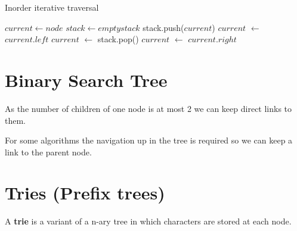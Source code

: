\begin{algorithm}[H]
	\caption{Inorder iterative traversal}
	\begin{algorithmic}
		\State $current \leftarrow node$
		\State $stack \leftarrow empty stack$
		\State stack.push($current$)
		\State $current$ $\leftarrow$ $current.left$
		\Else
		\State $current$ $\leftarrow$ stack.pop()
		\State{}
		\State $current$ $\leftarrow$ $current.right$
		\EndIf
		\EndWhile
		\EndProcedure
	\end{algorithmic}
\end{algorithm}

\section{Binary Search Tree}

As the number of children of one node is at most 2 we can keep direct links to them.

For some algorithms the navigation up in the tree is required so we can keep a link to the parent node.

\section{Tries (Prefix trees)}

A \textbf{trie} is a variant of a n-ary tree in which characters are stored at each node.  

\cite{latexcompanion}

